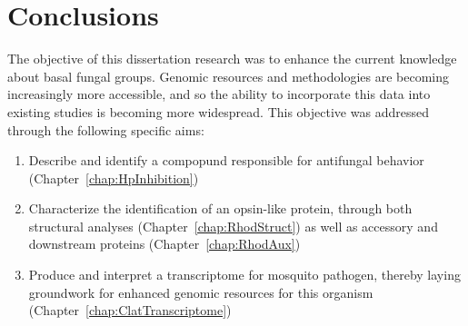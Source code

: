 \chapter{Conclusions}
The objective of this dissertation research was to enhance the current knowledge about basal fungal groups. Genomic resources and methodologies are becoming increasingly more accessible, and so the ability to incorporate this data into existing studies is becoming more widespread.
\indent This objective was addressed through the following specific aims:\\
\begin{enumerate}
  \item Describe and identify a compopund responsible for antifungal behavior (Chapter~\ref{chap:HpInhibition})
  \item Characterize the identification of an opsin-like protein, through both structural analyses (Chapter~\ref{chap:RhodStruct}) as well as accessory and downstream proteins (Chapter~\ref{chap:RhodAux})
  \item Produce and interpret a transcriptome for mosquito pathogen, thereby laying groundwork for enhanced genomic resources for this organism (Chapter~\ref{chap:ClatTranscriptome})
\end{enumerate}
